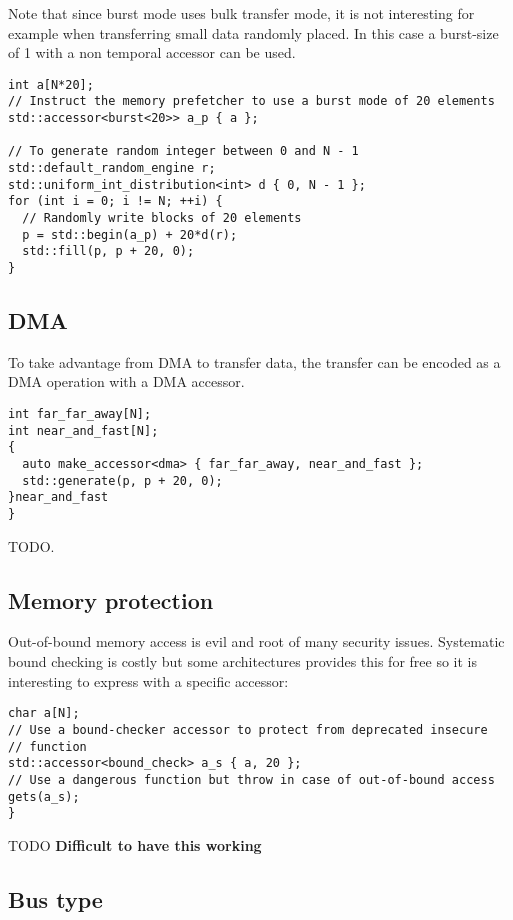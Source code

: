 \documentclass[a4paper]{article}
\begin{document}
Note that since burst mode uses bulk transfer mode, it is not
interesting for example when transferring small data randomly
placed. In this case a burst-size of 1 with a non temporal accessor
can be used.

\begin{lstlisting}
int a[N*20];
// Instruct the memory prefetcher to use a burst mode of 20 elements
std::accessor<burst<20>> a_p { a };

// To generate random integer between 0 and N - 1
std::default_random_engine r;
std::uniform_int_distribution<int> d { 0, N - 1 };
for (int i = 0; i != N; ++i) {
  // Randomly write blocks of 20 elements
  p = std::begin(a_p) + 20*d(r);
  std::fill(p, p + 20, 0);
}
\end{lstlisting}


\subsection{DMA}
\label{sec:dma}

To take advantage from DMA to transfer data, the transfer can be
encoded as a DMA operation with a DMA accessor.

\begin{lstlisting}
int far_far_away[N];
int near_and_fast[N];
{
  auto make_accessor<dma> { far_far_away, near_and_fast };
  std::generate(p, p + 20, 0);
}near_and_fast
}
\end{lstlisting}
TODO.


\subsection{Memory protection}
\label{sec:memory-protection}

Out-of-bound memory access is evil and root of many security
issues. Systematic bound checking is costly but some architectures
provides this for free so it is interesting to express with a specific
accessor:
\begin{lstlisting}
char a[N];
// Use a bound-checker accessor to protect from deprecated insecure
// function
std::accessor<bound_check> a_s { a, 20 };
// Use a dangerous function but throw in case of out-of-bound access
gets(a_s);
}
\end{lstlisting}

TODO \textbf{Difficult to have this working}


\subsection{Bus type}
\label{sec:bus-type}
\end{document}

